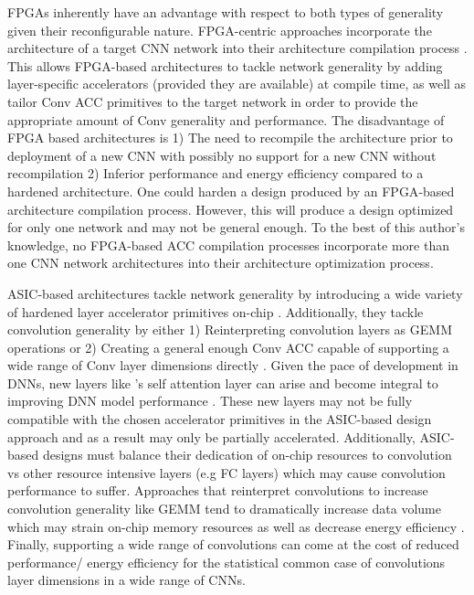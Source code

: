 \ac{FPGA}s inherently have an advantage with respect to both types of generality given
their reconfigurable nature. \ac{FPGA}-centric approaches incorporate the
architecture of a target \ac{CNN} network into their architecture compilation
process \cite{caffeine}. This allows \ac{FPGA}-based architectures to tackle
network generality by adding layer-specific accelerators (provided they are
available) at compile time, as well as tailor \ac{Conv} \ac{ACC} primitives to
the target network in order to provide the appropriate amount of \ac{Conv}
generality and performance. The disadvantage of \ac{FPGA} based architectures is
1) The need to recompile the architecture prior to deployment of a new \ac{CNN}
with possibly no support for a new \ac{CNN} without recompilation 2) Inferior performance and energy
efficiency compared to a hardened architecture. One could harden a design
produced by an \ac{FPGA}-based architecture compilation process. However, this
will produce a design optimized for only one network and may not be general
enough. To the best of this author's knowledge, no \ac{FPGA}-based \ac{ACC}
compilation processes incorporate more than one \ac{CNN} network architectures
into their architecture optimization process. 

\ac{ASIC}-based architectures tackle network generality by introducing a wide
variety of hardened layer accelerator primitives on-chip \cite{tpu}.
Additionally, they tackle convolution generality by either 1) Reinterpreting
convolution layers as \ac{GEMM} operations or 2) Creating a general
enough \ac{Conv} \ac{ACC} capable of supporting a wide range of \ac{Conv} layer
dimensions directly \cite{eyerissv2}. Given the pace of development in \ac{DNN}s,
new layers like \cite{transformer_model}'s self attention layer can
arise and become integral to improving \ac{DNN} model performance
\cite{conv_and_transformers}. These new layers may not be fully compatible with
the chosen accelerator primitives in the \ac{ASIC}-based design approach and as
a result may only be partially accelerated. Additionally, \ac{ASIC}-based
designs must balance their dedication of on-chip resources to convolution vs
other resource intensive layers (e.g \ac{FC} layers) which may cause convolution
performance to suffer. Approaches that reinterpret convolutions to increase
convolution generality like \ac{GEMM} tend to dramatically increase data volume
which may strain on-chip memory resources as well as decrease energy efficiency
\cite{caffeine}. Finally, supporting a wide range of convolutions can come at
the cost of reduced performance/ energy efficiency for the statistical common
case of convolutions layer dimensions in a wide range of \ac{CNN}s.  

